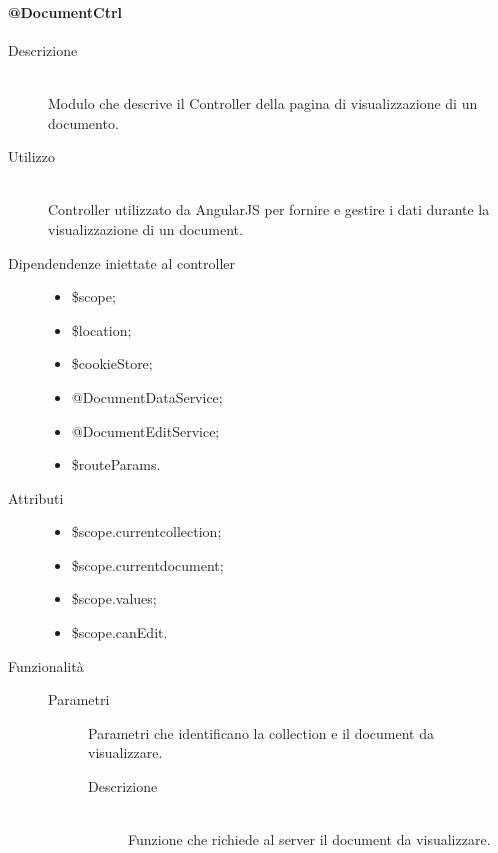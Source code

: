 \paragraph{@DocumentCtrl}
\begin{description}
 \item[Descrizione] \hfill \\
 Modulo che descrive il Controller della pagina di visualizzazione di un documento.
 
 \item[Utilizzo] \hfill \\
 Controller utilizzato da AngularJS per fornire e gestire i dati durante la visualizzazione di un document.
 
 \item[Dipendendenze iniettate al controller] \hfill
 \begin{itemize}
  \item \$scope;
  \item \$location;
  \item \$cookieStore;
  \item @DocumentDataService;
  \item @DocumentEditService;
  \item \$routeParams.
 \end{itemize}
 
 
 \item[Attributi] \hfill
 \begin{itemize}
 \item \$scope.current\textunderscore collection;
 \item \$scope.current\textunderscore document;
 \item \$scope.values;
 \item \$scope.canEdit.
 \end{itemize}
 
 \item[Funzionalità]
 \begin{mldescription}
  \begin{description}
  	\item[Parametri]
  		\begin{mldescription}
        Parametri che identificano la collection e il document da visualizzare.
  		\end{mldescription}
  	\begin{description}
  	\item[Descrizione] \hfill \\
	Funzione che richiede al server il document da visualizzare.
	\end{description}
  \end{description}


\end{mldescription}
\end{description}

